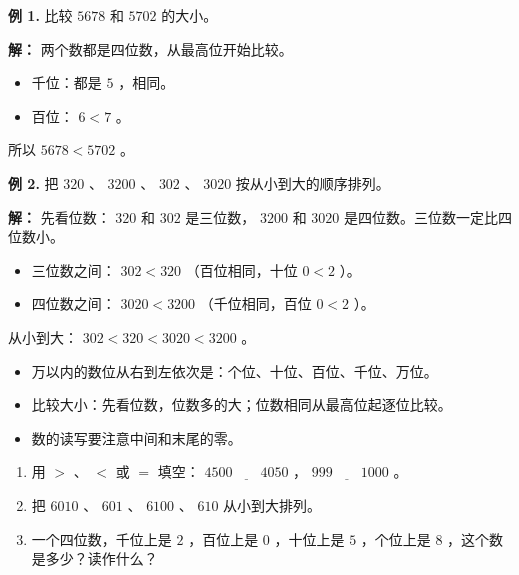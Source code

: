 \begin{workedexamples}


\textbf{例 1.} 比较 $5678$ 和 $5702$ 的大小。

\textbf{解：} 两个数都是四位数，从最高位开始比较。
\begin{itemize}
  \item 千位：都是 $5$ ，相同。
  \item 百位： $6 < 7$ 。
\end{itemize}


所以 $5678 < 5702$ 。

\textbf{例 2.} 把 $320$ 、 $3200$ 、 $302$ 、 $3020$ 按从小到大的顺序排列。

\textbf{解：} 先看位数： $320$ 和 $302$ 是三位数， $3200$ 和 $3020$ 是四位数。三位数一定比四位数小。
\begin{itemize}
  \item 三位数之间： $302 < 320$ （百位相同，十位 $0 < 2$ ）。
  \item 四位数之间： $3020 < 3200$ （千位相同，百位 $0 < 2$ ）。
\end{itemize}


从小到大： $302 < 320 < 3020 < 3200$ 。

\end{workedexamples}

\begin{keytakeaway}


\begin{itemize}
  \item 万以内的数位从右到左依次是：个位、十位、百位、千位、万位。
  \item 比较大小：先看位数，位数多的大；位数相同从最高位起逐位比较。
  \item 数的读写要注意中间和末尾的零。
\end{itemize}


\end{keytakeaway}

\begin{practice}


\begin{enumerate}
  \item 用 $>$ 、 $<$ 或 $=$ 填空： $4500 \enspace\underline{\quad}\enspace 4050$ ， $999 \enspace\underline{\quad}\enspace 1000$ 。
  \item 把 $6010$ 、 $601$ 、 $6100$ 、 $610$ 从小到大排列。
  \item 一个四位数，千位上是 $2$ ，百位上是 $0$ ，十位上是 $5$ ，个位上是 $8$ ，这个数是多少？读作什么？
\end{enumerate}


\end{practice}

